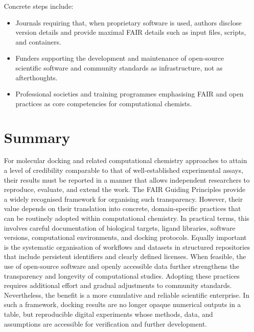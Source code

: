 \documentclass[12pt]{article}
\begin{document}
Concrete steps include:

\begin{itemize}
  \item Journals requiring that, when proprietary software is used, authors disclose version details and provide maximal FAIR details such as input files, scripts, and containers.
  \item Funders supporting the development and maintenance of open-source scientific software and community standards as infrastructure, not as afterthoughts.
  \item Professional societies and training programmes emphasising FAIR and open practices as core competencies for computational chemists.
\end{itemize}

\section{Summary}

For molecular docking and related computational chemistry approaches to attain a level of credibility comparable to that of well-established experimental assays, their results must be reported in a manner that allows independent researchers to reproduce, evaluate, and extend the work. The FAIR Guiding Principles provide a widely recognised framework for organising such transparency. However, their value depends on their translation into concrete, domain-specific practices that can be routinely adopted within computational chemistry. In practical terms, this involves careful documentation of biological targets, ligand libraries, software versions, computational environments, and docking protocols. Equally important is the systematic organisation of workflows and datasets in structured repositories that include persistent identifiers and clearly defined licenses. When feasible, the use of open-source software and openly accessible data further strengthens the transparency and longevity of computational studies. Adopting these practices requires additional effort and gradual adjustments to community standards. Nevertheless, the benefit is a more cumulative and reliable scientific enterprise. In such a framework, docking results are no longer opaque numerical outputs in a table, but reproducible digital experiments whose methods, data, and assumptions are accessible for verification and further development.



\end{document}
